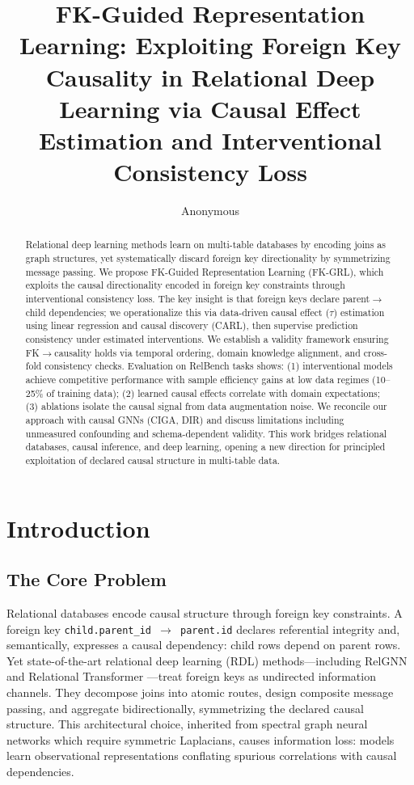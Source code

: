 \documentclass[11pt,letterpaper]{article}
\title{FK-Guided Representation Learning: Exploiting Foreign Key Causality in Relational Deep Learning via Causal Effect Estimation and Interventional Consistency Loss}
\author{Anonymous}
\date{}
\begin{document}
\maketitle

\begin{abstract}
Relational deep learning methods learn on multi-table databases by encoding joins as graph structures, yet systematically discard foreign key directionality by symmetrizing message passing. We propose FK-Guided Representation Learning (FK-GRL), which exploits the causal directionality encoded in foreign key constraints through interventional consistency loss. The key insight is that foreign keys declare parent$\rightarrow$child dependencies; we operationalize this via data-driven causal effect ($\tau$) estimation using linear regression and causal discovery (CARL), then supervise prediction consistency under estimated interventions. We establish a validity framework ensuring FK$\rightarrow$causality holds via temporal ordering, domain knowledge alignment, and cross-fold consistency checks. Evaluation on RelBench tasks shows: (1) interventional models achieve competitive performance with sample efficiency gains at low data regimes (10--25\% of training data); (2) learned causal effects correlate with domain expectations; (3) ablations isolate the causal signal from data augmentation noise. We reconcile our approach with causal GNNs (CIGA, DIR) and discuss limitations including unmeasured confounding and schema-dependent validity. This work bridges relational databases, causal inference, and deep learning, opening a new direction for principled exploitation of declared causal structure in multi-table data.
\end{abstract}

\section{Introduction}

\subsection{The Core Problem}

Relational databases encode causal structure through foreign key constraints. A foreign key \texttt{child.parent\_id $\rightarrow$ parent.id} declares referential integrity and, semantically, expresses a causal dependency: child rows depend on parent rows. Yet state-of-the-art relational deep learning (RDL) methods---including RelGNN \cite{Chen2025} and Relational Transformer \cite{Ranjan2025}---treat foreign keys as undirected information channels. They decompose joins into atomic routes, design composite message passing, and aggregate bidirectionally, symmetrizing the declared causal structure. This architectural choice, inherited from spectral graph neural networks which require symmetric Laplacians, causes information loss: models learn observational representations conflating spurious correlations with causal dependencies.
\end{document}
